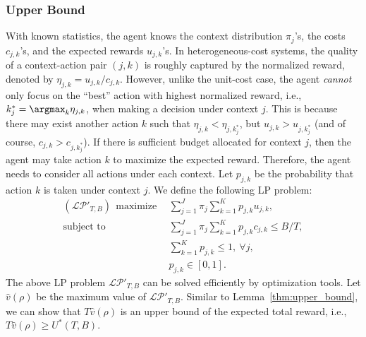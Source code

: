 \subsubsection{Upper Bound}
 With known statistics, the agent knows the context distribution $\pi_j$'s, the costs $c_{j,k}$'s, and the expected rewards $u_{j,k}$'s.
In heterogeneous-cost systems, the quality of a context-action pair $(j,k)$ is roughly captured by the normalized reward, denoted by $\eta_{j,k} = u_{j,k}/c_{j,k}$.
However, unlike the unit-cost case, the agent \emph{cannot} only focus on the ``best'' action with highest normalized reward, i.e., $k_j^* = \argmax_k \eta_{j,k}$, when making a decision under context $j$. This is because there may exist another action $k$ such that $\eta_{j,k} < \eta_{j,k_{j}^*}$, but $u_{j,k} > u_{j,k_j^*}$ (and of course, $c_{j,k} > c_{j, k_j^*}$). If there is sufficient budget allocated for context $j$, then the agent may take action $k$ to maximize the expected reward.
Therefore, the agent needs to consider all actions under each context. Let $p_{j,k}$ be the probability that action $k$ is taken under context $j$. We define the following LP problem:
\begin{align}
({\mathcal{LP}}'_{T,B})~~\text{maximize} &~~ \sum_{j = 1}^J \pi_j \sum_{k = 1}^K p_{j,k} u_{j,k},  \label{eq:LP_general_obj} \\
\text{subject to} &~~ \sum_{j = 1}^J \pi_j \sum_{k = 1}^K p_{j,k} c_{j,k} \leq B/T, \label{eq:LP_general_cost_const}\\
&~~\sum_{k = 1}^K p_{j,k} \leq 1, ~\forall j, \label{eq:LP_intra_cont_const} \\
&~~ p_{j,k} \in [0,1].\nonumber
\end{align}
The above LP problem ${\mathcal{LP}}'_{T,B}$ can be solved efficiently by optimization tools. Let $\hat{v}(\rho)$ be the maximum value of ${\mathcal{LP}}'_{T,B}$.
Similar to Lemma~\ref{thm:upper_bound}, we can show that $T\hat{v}(\rho)$ is an upper bound of the expected total reward, i.e., $T\hat{v}(\rho) \geq U^*(T,B)$.


